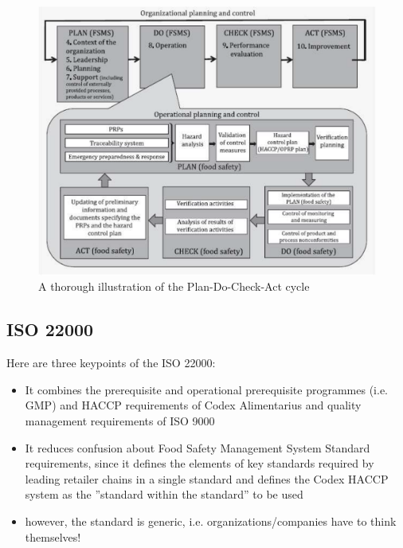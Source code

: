 \begin{figure}
    \centering
    \includegraphics[width=1\textwidth]{Figures/ThoroughDC.png}
    \caption{A thorough illustration of the Plan-Do-Check-Act cycle}
    \label{fig:ThoroughDC}
\end{figure}



\subsection{ISO 22000}
Here are three keypoints of the ISO 22000:

\begin{highlight}
    \begin{itemize}
        \item It combines the prerequisite and operational prerequisite
        programmes (i.e. GMP) and HACCP requirements of Codex
        Alimentarius and quality management requirements of ISO 9000
        \item It reduces confusion about Food Safety Management System
        Standard requirements, since it defines the elements of key
        standards required by leading retailer chains in a single standard
        and defines the Codex HACCP system as the ”standard within the
        standard” to be used
        \item however, the standard is generic, i.e. organizations/companies have to think themselves!
    \end{itemize}
\end{highlight}

